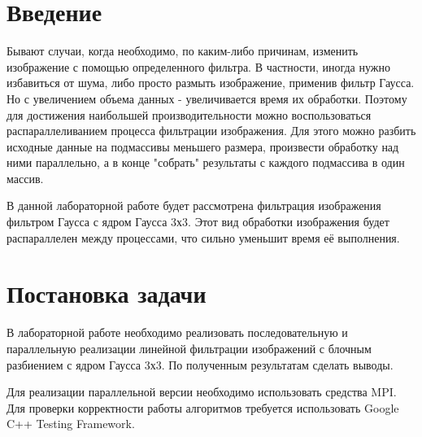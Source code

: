 \documentclass{report}
\begin{document}
\setcounter{page}{2}

\tableofcontents
\newpage

\section*{Введение}
Бывают случаи, когда необходимо, по каким-либо причинам, изменить изображение с помощью определенного фильтра. В частности, иногда нужно избавиться от шума, либо просто размыть изображение, применив фильтр Гаусса. Но с увеличением объема данных - увеличивается время их обработки. Поэтому для достижения наибольшей производительности можно воспользоваться распараллеливанием процесса фильтрации изображения. Для этого можно разбить исходные данные на подмассивы меньшего размера, произвести обработку над ними параллельно, а в конце "собрать" результаты с каждого подмассива в один массив.
\par В данной лабораторной работе будет рассмотрена фильтрация изображения фильтром Гаусса с ядром Гаусса 3х3. Этот вид обработки изображения будет распараллелен между процессами, что сильно уменьшит время её выполнения.
\newpage

\section*{Постановка задачи}
В лабораторной работе необходимо реализовать последовательную и параллельную реализации линейной фильтрации изображений с блочным разбиением с ядром Гаусса 3х3. По полученным результатам сделать выводы.
\par Для реализации параллельной версии необходимо использовать средства MPI. Для проверки корректности работы алгоритмов требуется использовать Google C++ Testing Framework.
\newpage

\end{document}
